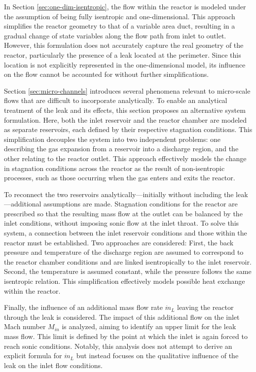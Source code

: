 In Section \ref{sec:one-dim-isentropic}, the flow within the reactor is modeled under the assumption of being fully isentropic and one-dimensional. This approach simplifies the reactor geometry to that of a variable area duct, resulting in a gradual change of state variables along the flow path from inlet to outlet. However, this formulation does not accurately capture the real geometry of the reactor, particularly the presence of a leak located at the perimeter. Since this location is not explicitly represented in the one-dimensional model, its influence on the flow cannot be accounted for without further simplifications.

Section \ref{sec:micro-channels} introduces several phenomena relevant to micro-scale flows that are difficult to incorporate analytically. To enable an analytical treatment of the leak and its effects, this section proposes an alternative system formulation. Here, both the inlet reservoir and the reactor chamber are modeled as separate reservoirs, each defined by their respective stagnation conditions. This simplification decouples the system into two independent problems: one describing the gas expansion from a reservoir into a discharge region, and the other relating to the reactor outlet. This approach effectively models the change in stagnation conditions across the reactor as the result of non-isentropic processes, such as those occurring when the gas enters and exits the reactor.

To reconnect the two reservoirs analytically—initially without including the leak—additional assumptions are made. Stagnation conditions for the reactor are prescribed so that the resulting mass flow at the outlet can be balanced by the inlet conditions, without imposing sonic flow at the inlet throat. To solve this system, a connection between the inlet reservoir conditions and those within the reactor must be established. Two approaches are considered: First, the back pressure and temperature of the discharge region are assumed to correspond to the reactor chamber conditions and are linked isentropically to the inlet reservoir. Second, the temperature is assumed constant, while the pressure follows the same isentropic relation. This simplification effectively models possible heat exchange within the reactor.

Finally, the influence of an additional mass flow rate $\dot{m}_L$ leaving the reactor through the leak is considered. The impact of this additional flow on the inlet Mach number $M_{in}$ is analyzed, aiming to identify an upper limit for the leak mass flow. This limit is defined by the point at which the inlet is again forced to reach sonic conditions. Notably, this analysis does not attempt to derive an explicit formula for $\dot{m}_L$ but instead focuses on the qualitative influence of the leak on the inlet flow conditions.

